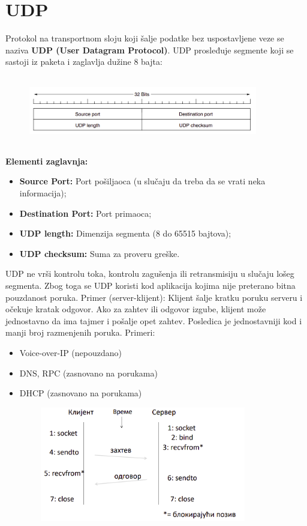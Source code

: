 \documentclass[a4paper]{article}
\begin{document}
\section{UDP}
    Protokol na transportnom sloju koji šalje podatke bez uspostavljene veze se naziva \textbf{UDP
    (User Datagram Protocol)}. UDP prosleđuje segmente koji se sastoji iz paketa i zaglavlja
    dužine 8 bajta:
    \begin{figure}[H]
        \begin{center}
            \includegraphics[width=100mm,height=30mm]{Slike/udp1.png}
        \end{center}
    \end{figure}
    \textbf{Elementi zaglavnja:}
    \begin{itemize}
        \item \textbf{Source Port:} Port pošiljaoca (u slučaju da treba da se vrati neka informacija);
        \item \textbf{Destination Port:} Port primaoca;
        \item \textbf{UDP length:} Dimenzija segmenta (8 do 65515 bajtova);
        \item \textbf{UDP checksum:} Suma za proveru greške.
    \end{itemize}
    UDP ne vrši kontrolu toka, kontrolu zagušenja ili retransmisiju u slučaju lošeg segmenta.
    Zbog toga se UDP koristi kod aplikacija kojima nije preterano bitna pouzdanost poruka.
    Primer (server-klijent): Klijent šalje kratku poruku serveru i očekuje kratak odgovor. Ako
    za zahtev ili odgovor izgube, klijent može jednostavno da ima tajmer i pošalje opet
    zahtev. Posledica je jednostavniji kod i manji broj razmenjenih poruka. Primeri:
    \begin{itemize}
        \item Voice-over-IP (nepouzdano)
        \item DNS, RPC (zasnovano na porukama)
        \item DHCP (zasnovano na porukama)
    \end{itemize}
    \begin{figure}[H]
        \begin{center}
            \includegraphics[width=100mm,height=50mm]{Slike/udp2.png}
        \end{center}
    \end{figure}
\end{document}
